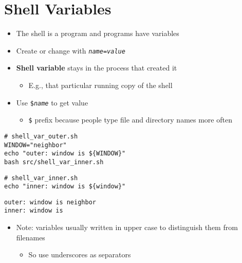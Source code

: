 \documentclass[krantzl]{krantz}
\newcommand{\glossref}[1]{\textbf{#1}}
\begin{document}
\section{Shell Variables}
\begin{itemize}
\item The shell is a program and programs have variables

\item Create or change with \texttt{\emph{name}=\emph{value}}

\item \glossref{Shell variable} stays in the process that created it\begin{itemize}
\item E.g., that particular running copy of the shell

\end{itemize}


\item Use \texttt{\$\emph{name}} to get value\begin{itemize}
\item \texttt{\$} prefix because people type file and directory names more often

\end{itemize}


\end{itemize}
\begin{lstlisting}[frame=tblr]
# shell_var_outer.sh
WINDOW="neighbor"
echo "outer: window is ${WINDOW}"
bash src/shell_var_inner.sh
\end{lstlisting}

\begin{lstlisting}[frame=tblr]
# shell_var_inner.sh
echo "inner: window is ${window}"
\end{lstlisting}

\begin{lstlisting}[frame=tblr,backgroundcolor=\color{black!5}]
outer: window is neighbor
inner: window is
\end{lstlisting}

\begin{itemize}
\item Note: variables usually written in upper case to distinguish them from filenames\begin{itemize}
\item So use underscores as separators

\end{itemize}


\end{itemize}
\end{document}
